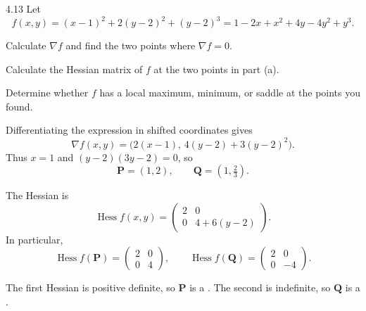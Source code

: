 \documentclass[11pt,oneside]{article}
\begin{document}
\begin{problem}{4.13}
Let
\[
 f(x,y)=(x-1)^2+2(y-2)^2+(y-2)^3
       =1-2x+x^2+4y-4y^2+y^3.
\]
\begin{problemsubparts}
\item Calculate $\nabla f$ and find the two points where $\nabla f=0$.
\item Calculate the Hessian matrix of $f$ at the two points in part (a).
\item Determine whether $f$ has a local maximum, minimum, or saddle
at the points you found.
\end{problemsubparts}
\end{problem}
\begin{solution}
\begin{problemsubparts}
\item Differentiating the expression in shifted coordinates gives
\[
 \nabla f(x,y)=\bigl(2(x-1),\,4(y-2)+3(y-2)^2\bigr).
\]
Thus $x=1$ and $(y-2)(3y-2)=0$, so
\[
 \boxed{\mathbf P=(1,2),\qquad \mathbf Q=(1,\tfrac23)}.
\]
\item The Hessian is
\[
 \operatorname{Hess}f(x,y)=
 \begin{pmatrix}2&0\\0&4+6(y-2)\end{pmatrix}.
\]
In particular,
\[
 \boxed{\operatorname{Hess}f(\mathbf P)=\begin{pmatrix}2&0\\0&4\end{pmatrix}},
 \qquad
 \boxed{\operatorname{Hess}f(\mathbf Q)=\begin{pmatrix}2&0\\0&-4\end{pmatrix}}.
\]
\item The first Hessian is positive definite, so $\mathbf P$ is a
. The second is indefinite,
so $\mathbf Q$ is a .
\end{problemsubparts}
\end{solution}
\end{document}
